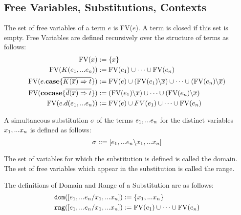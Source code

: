 \documentclass[twoside,12pt,a4paper]{article}
\begin{document}
\subsection{Free Variables, Substitutions, Contexts}

\begin{definition}
    The set of free variables of a term $e$ is FV($e$). A term is closed if this set is empty.
    Free Variables are defined recursively over the structure of terms as follows:
    \begin{align*}
        \begin{split}
            \text{FV}(x) &:= \{x\}\\
            \text{FV}(K(e_1,...e_n)) &:= \text{FV}(e_1) \cup \dots\cup \text{FV}(e_n)\\
            \text{FV}(e.\textbf{case}\{\overline{K(\overline{x})\Rightarrow t}\}) &:= \text{FV}(e)\cup (\text{FV}(e_1)\backslash\overline{x})\cup \dots\cup (\text{FV}(e_n)\backslash\overline{x})\\
            \text{FV}(\textbf{cocase}\{\overline{d(\overline{x})\Rightarrow t}\}) &:= (\text{FV}(e_1)\backslash\overline{x})\cup \dots\cup (\text{FV}(e_n)\backslash\overline{x})\\
            \text{FV}(e.d(e_1,...e_n)) &:= \text{FV}(e)\cup FV(e_1) \cup \dots \cup \text{FV}(e_n)    
        \end{split}
    \end{align*}
\end{definition}


\begin{definition}[Substitution]
    A simultaneous substitution $\sigma$ of the terms $e_1,...e_n$ for the distinct variables $x_1,...x_n$ is defined as follows:
    \begin{align*} %
        \sigma ::= [\listofexpr \backslash\listofvar]
    \end{align*}
\end{definition}

The set of variables for which the substitution is defined is called the domain.
The set of free variables which appear in the substitution is called the range. %

\begin{definition}
    The definitions of Domain and Range of a Substitution are as follows:
    \begin{align*}
        \texttt{dom}([e_1,...e_n/x_1,...x_n]) &:= \{x_1,...x_n\}\\
        \texttt{rng}([e_1,...e_n/x_1,...x_n]) &:= \text{FV}(e_1)\cup \dots\cup\text{FV}(e_n)
    \end{align*}
\end{definition}
\end{document}
